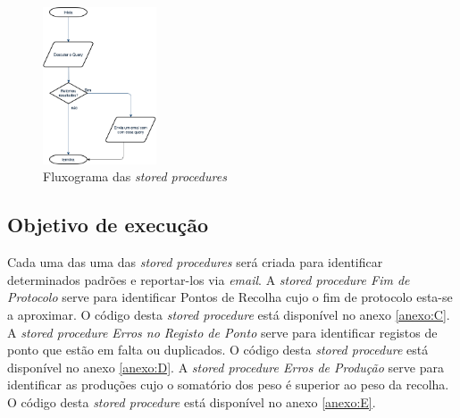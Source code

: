 \begin{figure}[h] 
	\begin{center}
		\includegraphics[width=0.30\textwidth,keepaspectratio]{figuras/FluxogramaEmail.png}
		\caption{Fluxograma das \textit{stored procedures}}
		\label{fig:stored_procedure} 
	\end{center}
\end{figure}


\subsection{Objetivo de execução}
Cada uma das uma das \textit{stored procedures} será criada para identificar determinados padrões e reportar-los via \textit{email}.
A \textit{stored procedure Fim de Protocolo} serve para identificar Pontos de Recolha cujo o fim de protocolo esta-se a aproximar. O código desta \textit{stored procedure} está disponível no anexo \ref{anexo:C}.
A \textit{stored procedure Erros no Registo de Ponto} serve para identificar registos de ponto que estão em falta ou duplicados. O código desta \textit{stored procedure} está disponível no anexo \ref{anexo:D}.
A \textit{stored procedure Erros de Produção} serve para identificar as produções cujo o somatório dos peso é superior ao peso da recolha. O código desta \textit{stored procedure} está disponível no anexo \ref{anexo:E}.